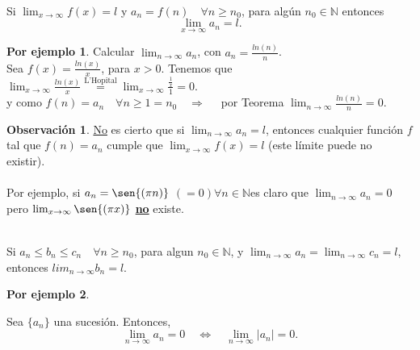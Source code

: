 \documentclass{article}
\theoremstyle{definition}
\newtheorem*{obs}{Observación}
\newtheorem*{ej}{Por ejemplo}
\theoremstyle{remark}
\begin{document}
\begin{teo} \; \\
Si $\lim_{x \to \infty }{f(x)}=l$ y $a_n=f(n) \quad \forall n \geq n_0$, para algún $n_0 \in \mathbb{N}$ entonces \[
  \lim_{x\to\infty}{a_n}=l.
\]

\end{teo}
\begin{ej}
  Calcular $\lim_{n \to \infty}{a_n}$, con $a_n=\frac{ln(n)}{n}$. \\
  Sea $f(x)=\frac{ln(x)}{x}$, para $x>0$. Tenemos que $\lim_{x \to \infty}{\frac{ln(x)}{x}} \overset{\text{L'Hopital}}{=} \lim_{x \to \infty}{\frac{\frac{1}{x}}{1}}=0.$ \\
  y como $f(n)=a_n \quad \forall n \geq 1=n_0 \quad \Rightarrow \quad$ por Teorema $\lim_{n \to \infty }{\frac{ln(n)}{n}}=0$.
\end{ej}
\begin{obs}
  \underline{No} es cierto que si $\lim_{n \to \infty}{a_n}=l$, entonces cualquier función $f$ tal que $f(n)=a_n$ cumple que $\lim_{x \to \infty }{f(x)}=l$ (este límite puede no existir). \\\\
  Por ejemplo, si $a_n=\sen{(\pi n)}$ $(=0) \forall n \in \mathbb{N}$es claro que $\lim_{n \to \infty}{a_n=0}$ pero $\lim_{x \to \infty}{\sen{(\pi x)}}$ \underline{\textbf{no}} existe.
\end{obs}

\pagebreak

\begin{teo} \; \\
  Si $a_n \leq b_n \leq c_n \quad \forall n \geq n_0$, para algun $n_0 \in \mathbb{N}$, y $\lim_{n \to \infty}{a_n}=\lim_{n \to \infty}{c_n}=l$, entonces $lim_{n \to \infty}{b_n}=l$.
\end{teo}

\begin{figure}[h]
\centering
\def\svgwidth{0.75\textwidth}

\end{figure}

\begin{ej} \; \\

\end{ej}

\begin{teo}
Sea $\{ a_n \}$ una sucesión. Entonces, $$\lim_{n \to \infty } a_n = 0 \quad \Leftrightarrow \quad \lim_{n \to \infty } |a_n| = 0.$$
\end{teo}
\end{document}
